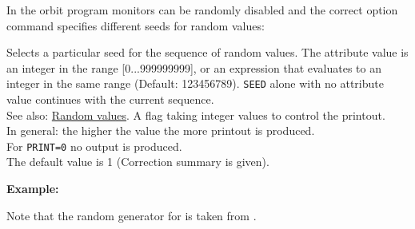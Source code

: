 
In the orbit program monitors can be randomly disabled and the correct
option command specifies different seeds for random values:  

\begin{madlist}
    Selects a particular seed for the sequence of random values. 
     The attribute value is an integer in the range [0...999999999], or an expression that evaluates to an integer in the same range
     (Default: 123456789). 
     {\tt SEED} alone with no attribute value continues with the current sequence.
     \\ See also: \hyperref[subsubsec:random]{Random values}. 
    A flag taking integer values to control the printout. 
     \\ In general: the higher the value the more printout is produced.  
     \\ For {\tt PRINT=0} no output is produced. 
     \\ The default value is 1 (Correction summary is given). 
\end{madlist}

{\bf Example:}

Note that the random generator for \mad is taken from \cite{knuth1981}.





